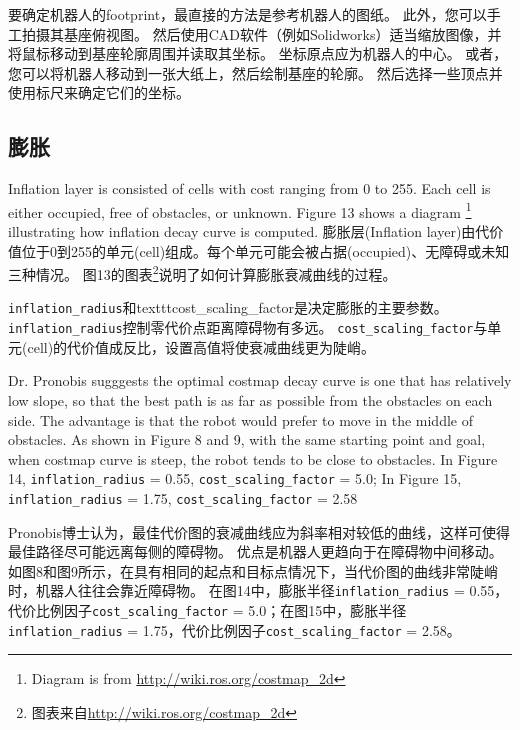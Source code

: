 要确定机器人的footprint，最直接的方法是参考机器人的图纸。 
此外，您可以手工拍摄其基座俯视图。 然后使用CAD软件（例如Solidworks）适当缩放图像，并将鼠标移动到基座轮廓周围并读取其坐标。 
坐标原点应为机器人的中心。 
或者，您可以将机器人移动到一张大纸上，然后绘制基座的轮廓。 然后选择一些顶点并使用标尺来确定它们的坐标。

\subsection[inflation]{膨胀}%
Inflation layer is consisted of cells with cost ranging from 0 to 255. Each cell is either occupied, free of obstacles, or unknown. Figure 13 shows a diagram \footnote{Diagram is from \url{http://wiki.ros.org/costmap_2d}} illustrating how inflation decay curve is computed.
膨胀层(Inflation layer)由代价值位于0到255的单元(cell)组成。每个单元可能会被占据(occupied)、无障碍或未知三种情况。
图13的图表\footnote{图表来自\url{http://wiki.ros.org/costmap_2d}}说明了如何计算膨胀衰减曲线的过程。



\texttt{inflation\_radius}和texttt{cost\_scaling\_factor}是决定膨胀的主要参数。
\texttt{inflation\_radius}控制零代价点距离障碍物有多远。
\texttt{cost\_scaling\_factor}与单元(cell)的代价值成反比，设置高值将使衰减曲线更为陡峭。

Dr. Pronobis sugggests the optimal costmap decay curve is one that has relatively low slope, so that the best path is as far as possible from the obstacles on each side. The advantage is that the robot would prefer to move in the middle of obstacles.  As shown in Figure 8 and 9, with the same starting point and goal, when costmap curve is steep, the robot tends to be close to obstacles. In Figure 14, \texttt{inflation\_radius} = 0.55, \texttt{cost\_scaling\_factor} = 5.0; In Figure 15, \texttt{inflation\_radius} = 1.75, \texttt{cost\_scaling\_factor} = 2.58

Pronobis博士认为，最佳代价图的衰减曲线应为斜率相对较低的曲线，这样可使得最佳路径尽可能远离每侧的障碍物。
优点是机器人更趋向于在障碍物中间移动。
如图8和图9所示，在具有相同的起点和目标点情况下，当代价图的曲线非常陡峭时，机器人往往会靠近障碍物。
在图14中，膨胀半径\texttt{inflation\_radius} = 0.55，代价比例因子\texttt{cost\_scaling\_factor} = 5.0；在图15中，膨胀半径\texttt{inflation\_radius} = 1.75，代价比例因子\texttt{cost\_scaling\_factor} = 2.58。

